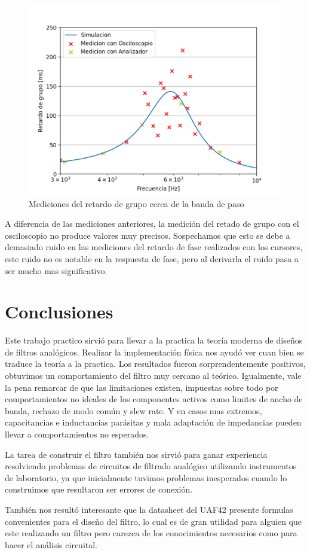 \documentclass[11pt,a4paper]{report}
\begin{document}
\begin{figure}[H]
\centering
\includegraphics[scale=0.7]{figs/plots/delay_zoom.png}
\caption{Mediciones del retardo de grupo cerca de la banda de paso}
\end{figure}

A diferencia de las mediciones anteriores, la medición del retado de grupo con el osciloscopio no produce valores muy precisos. Sospechamos que esto se debe a demasiado ruido en las mediciones del retardo de fase realizados con los cursores, este ruido no es notable en la respuesta de fase, pero al derivarla el ruido pasa a ser mucho mas significativo.


\chapter{Conclusiones}

Este trabajo practico sirvió para llevar a la practica la teoría moderna de diseños de filtros analógicos. Realizar la implementación física nos ayudó ver cuan bien se traduce la teoría a la practica. Los resultados fueron sorprendentemente positivos, obtuvimos un comportamiento del filtro muy cercano al teórico. Igualmente, vale la pena remarcar de que las limitaciones existen, impuestas sobre todo por comportamientos no ideales de los componentes activos como limites de ancho de banda, rechazo de modo común y slew rate. Y en casos mas extremos, capacitancias e inductancias parásitas y mala adaptación de impedancias pueden llevar a comportamientos no esperados.

La tarea de construir el filtro también nos sirvió para ganar experiencia resolviendo problemas de circuitos de filtrado analógico utilizando instrumentos de laboratorio, ya que inicialmente tuvimos problemas inesperados cuando lo construimos que resultaron ser errores de conexión.

También nos resultó interesante que la datasheet del UAF42 presente formulas convenientes para el diseño del filtro, lo cual es de gran utilidad para alguien que este realizando un filtro pero carezca de los conocimientos necesarios como para hacer el análisis circuital.


\printbibliography[title={References}]
\end{document}

